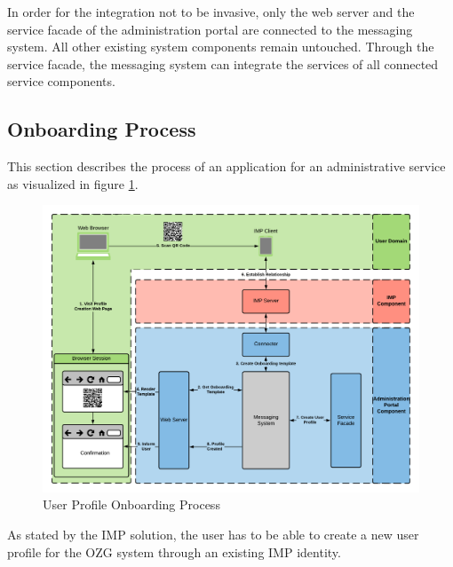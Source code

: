 In order for the integration not to be invasive, only the web server and the service facade of the administration portal are connected to the messaging system. All other existing system components remain untouched. Through the service facade, the messaging system can integrate the services of all connected service components.

\subsection{Onboarding Process}
This section describes the process of an application for an administrative service as visualized in figure \ref{integration1:onboarding_overview}.

\begin{figure}[h!]
    \centering
    \includegraphics[scale=0.6]{Diagrams/Integration Architecture 1/Technological Integration/5. Onboarding Overview.pdf}
    \caption{User Profile Onboarding Process}
    \label{integration1:onboarding_overview}
\end{figure}

As stated by the IMP solution, the user has to be able to create a new user profile for the OZG system through an existing IMP identity. 

